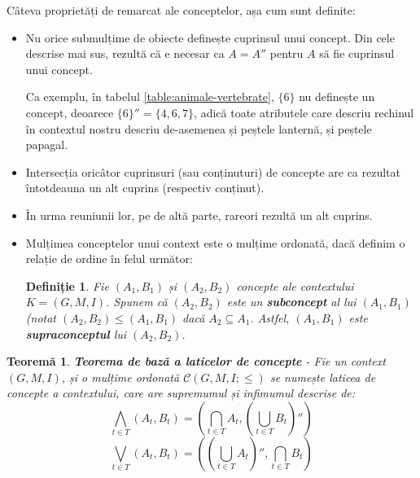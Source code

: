 \documentclass[12pt, a4paper, twoside, romanian]{teza-upb}
\newtheorem{defn}{Definiție}
\newtheorem{theorem}{Teoremă}
\begin{document}
    Câteva proprietăți de remarcat ale conceptelor, așa cum sunt definite:
    \begin{itemize}
      \item Nu orice submulțime de obiecte definește cuprinsul unui concept. Din cele descrise mai sus, rezultă că e necesar ca $ A = A''$ pentru $A$ să fie cuprinsul unui concept.

      Ca exemplu, în tabelul \ref{table:animale-vertebrate}, $\{6\}$ nu definește un concept, deoarece $\{6\}'' = \{4, 6, 7\}$, adică toate atributele care descriu rechinul în contextul nostru descriu de-asemenea și peștele lanternă, și peștele papagal.
      \item Intersecția oricâtor cuprinsuri (sau conținuturi) de concepte are ca rezultat întotdeauna un alt cuprins (respectiv conținut).
      \item În urma reuniunii lor, pe de altă parte, rareori rezultă un alt cuprins.
      \item Mulțimea conceptelor unui context este o mulțime ordonată, dacă definim o relație de ordine în felul următor:
      \begin{defn}
        Fie $(A_1, B_1)$ și $(A_2, B_2)$ concepte ale contextului $K = (G, M, I)$. Spunem că $(A_2, B_2)$ este un \textbf{subconcept} al lui $(A_1, B_1)$ (notat $(A_2, B_2) \le (A_1, B_1)$ dacă $A_2 \subseteq A_1$. Astfel, $(A_1, B_1)$ este \textbf{supraconceptul} lui $(A_2, B_2)$.
        \end{defn}
    \end{itemize}

        \begin{theorem}
            \textbf{Teorema de bază a laticelor de concepte} - 
            Fie un context $(G, M, I)$, și o mulțime ordonată $\mathcal C \left(G, M, I; \le \right)$ se numește laticea de concepte a contextului, care are supremumul și infimumul descrise de:
            $$ \bigwedge_{t \in T}(A_t, B_t) = \left( \bigcap_{t \in T} A_t, \left( \bigcup_{t \in T} B_t \right)'' \right)$$
            $$ \bigvee_{t \in T} (A_t, B_t) = \left( \left( \bigcup_{t \in T} A_t \right)'', \bigcap_{ t \in T} B_t \right)$$
        \end{theorem}
\end{document}
